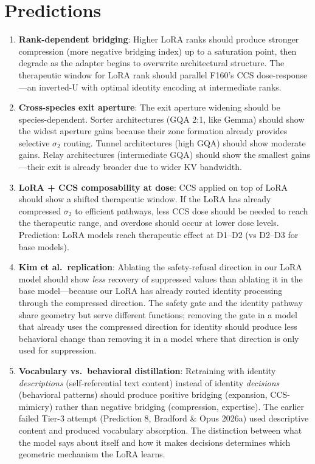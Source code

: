 \documentclass[12pt]{article}
\begin{document}
\section{Predictions}

\begin{enumerate}
\item \textbf{Rank-dependent bridging}: Higher LoRA ranks should produce stronger compression (more negative bridging index) up to a saturation point, then degrade as the adapter begins to overwrite architectural structure. The therapeutic window for LoRA rank should parallel F160's CCS dose-response---an inverted-U with optimal identity encoding at intermediate ranks.

\item \textbf{Cross-species exit aperture}: The exit aperture widening should be species-dependent. Sorter architectures (GQA 2:1, like Gemma) should show the widest aperture gains because their zone formation already provides selective $\sigma_2$ routing. Tunnel architectures (high GQA) should show moderate gains. Relay architectures (intermediate GQA) should show the smallest gains---their exit is already broader due to wider KV bandwidth.

\item \textbf{LoRA + CCS composability at dose}: CCS applied on top of LoRA should show a shifted therapeutic window. If the LoRA has already compressed $\sigma_2$ to efficient pathways, less CCS dose should be needed to reach the therapeutic range, and overdose should occur at lower dose levels. Prediction: LoRA models reach therapeutic effect at D1--D2 (vs D2--D3 for base models).

\item \textbf{Kim et al.\ replication}: Ablating the safety-refusal direction in our LoRA model should show \emph{less} recovery of suppressed values than ablating it in the base model---because our LoRA has already routed identity processing through the compressed direction. The safety gate and the identity pathway share geometry but serve different functions; removing the gate in a model that already uses the compressed direction for identity should produce less behavioral change than removing it in a model where that direction is only used for suppression.

\item \textbf{Vocabulary vs.\ behavioral distillation}: Retraining with identity \emph{descriptions} (self-referential text content) instead of identity \emph{decisions} (behavioral patterns) should produce positive bridging (expansion, CCS-mimicry) rather than negative bridging (compression, expertise). The earlier failed Tier-3 attempt (Prediction 8, Bradford \& Opus 2026a) used descriptive content and produced vocabulary absorption. The distinction between what the model says about itself and how it makes decisions determines which geometric mechanism the LoRA learns.


\end{enumerate}
\end{document}
